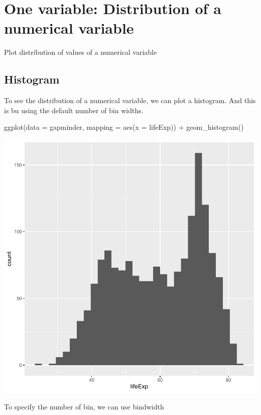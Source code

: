 \documentclass[
]{book}
\makeatletter
\newenvironment{Shaded}{\begin{snugshade}}{\end{snugshade}}
\newcommand{\AttributeTok}[1]{\textcolor[rgb]{0.61,0.61,0.61}{#1}}
\newcommand{\FunctionTok}[1]{\textcolor[rgb]{0,0,0}{#1}}
\newcommand{\NormalTok}[1]{#1}
\newcommand{\SpecialCharTok}[1]{\textcolor[rgb]{0,0,0}{#1}}
\newenvironment{kframe}{%
\medskip{}
\setlength{\fboxsep}{.8em}
 \def\at@end@of@kframe{}%
 \ifinner\ifhmode%
  \def\at@end@of@kframe{\end{minipage}}%
  \begin{minipage}{\columnwidth}%
 \fi\fi%
 \def\FrameCommand##1{\hskip\@totalleftmargin \hskip-\fboxsep
 \colorbox{shadecolor}{##1}\hskip-\fboxsep
     \hskip-\linewidth \hskip-\@totalleftmargin \hskip\columnwidth}%
 \MakeFramed {\advance\hsize-\width
   \@totalleftmargin\z@ \linewidth\hsize
   \@setminipage}}%
 {\par\unskip\endMakeFramed%
 \at@end@of@kframe}
\renewenvironment{Shaded}{\begin{kframe}}{\end{kframe}}
\makeatother
\begin{document}
\hypertarget{one-variable-distribution-of-a-numerical-variable}{%
\section{One variable: Distribution of a numerical variable}\label{one-variable-distribution-of-a-numerical-variable}}

Plot distribution of values of a numerical variable

\hypertarget{histogram}{%
\subsection{Histogram}\label{histogram}}

To see the distribution of a numerical variable, we can plot a histogram. And this is bu using the default number of bin widths.

\begin{Shaded}
\begin{Highlighting}[]
\FunctionTok{ggplot}\NormalTok{(}\AttributeTok{data =}\NormalTok{ gapminder, }\AttributeTok{mapping =} \FunctionTok{aes}\NormalTok{(}\AttributeTok{x =}\NormalTok{ lifeExp)) }\SpecialCharTok{+} \FunctionTok{geom\_histogram}\NormalTok{()}
\end{Highlighting}
\end{Shaded}

\begin{center}\includegraphics[width=0.7\linewidth,keepaspectratio]{Multivariable_Data_Analysis_files/figure-latex/unnamed-chunk-73-1} \end{center}

To specify the number of bin, we can use bindwidth
\end{document}
